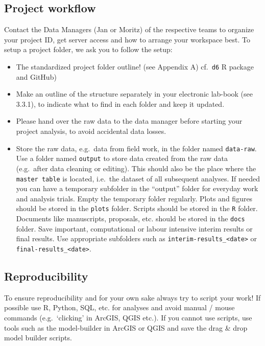 \documentclass[
  english,
]{article}
\providecommand{\tightlist}{%
  \setlength{\itemsep}{0pt}\setlength{\parskip}{0pt}}
\begin{document}
\hypertarget{project-workflow}{%
\subsection{Project workflow}\label{project-workflow}}

Contact the Data Managers (Jan or Moritz) of the respective teams to
organize your project ID, get server access and how to arrange your
workspace best. To setup a project folder, we ask you to follow the
setup:

\begin{itemize}
\tightlist
\item
  The standardized project folder outline! (see Appendix A)
  cf.~\texttt{d6} R package and GitHub)
\item
  Make an outline of the structure separately in your electronic
  lab-book (see 3.3.1), to indicate what to find in each folder and keep
  it updated.
\item
  Please hand over the raw data to the data manager before starting your
  project analysis, to avoid accidental data losses.
\item
  Store the raw data, e.g.~data from field work, in the folder named
  \texttt{data-raw}. Use a folder named \texttt{output} to store data
  created from the raw data (e.g.~after data cleaning or editing). This
  should also be the place where the \texttt{master\ table} is located,
  i.e.~the dataset of all subsequent analyses. If needed you can have a
  temporary subfolder in the ``output'' folder for everyday work and
  analysis trials. Empty the temporary folder regularly. Plots and
  figures should be stored in the \texttt{plots} folder. Scripts should
  be stored in the \texttt{R} folder. Documents like manuscripts,
  proposals, etc. should be stored in the \texttt{docs} folder. Save
  important, computational or labour intensive interim results or final
  results. Use appropriate subfolders such as
  \texttt{interim-results\_\textless{}date\textgreater{}} or
  \texttt{final-results\_\textless{}date\textgreater{}}.
\end{itemize}

\hypertarget{reproducibility}{%
\subsection{Reproducibility}\label{reproducibility}}

To ensure reproducibility and for your own sake always try to script
your work! If possible use R, Python, SQL, etc. for analyses and avoid
manual / mouse commands (e.g.~`clicking' in ArcGIS, QGIS etc.). If you
cannot use scripts, use tools such as the model-builder in ArcGIS or
QGIS and save the drag \& drop model builder scripts.
\end{document}
